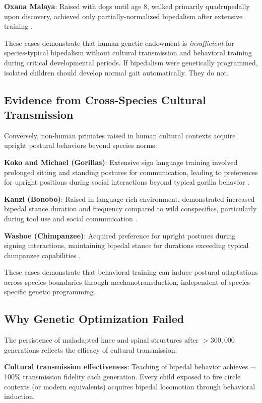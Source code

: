 \documentclass[12pt,a4paper]{article}
\begin{document}
\textbf{Oxana Malaya}: Raised with dogs until age 8, walked primarily quadrupedally upon discovery, achieved only partially-normalized bipedalism after extensive training \citep{wilson2003nurture}.

These cases demonstrate that human genetic endowment is \textit{insufficient} for species-typical bipedalism without cultural transmission and behavioral training during critical developmental periods. If bipedalism were genetically programmed, isolated children should develop normal gait automatically. They do not.

\subsection{Evidence from Cross-Species Cultural Transmission}

Conversely, non-human primates raised in human cultural contexts acquire upright postural behaviors beyond species norms:

\textbf{Koko and Michael (Gorillas)}: Extensive sign language training involved prolonged sitting and standing postures for communication, leading to preferences for upright positions during social interactions beyond typical gorilla behavior \citep{patterson1978linguistic}.

\textbf{Kanzi (Bonobo)}: Raised in language-rich environment, demonstrated increased bipedal stance duration and frequency compared to wild conspecifics, particularly during tool use and social communication \citep{savage-rumbaugh1998apes}.

\textbf{Washoe (Chimpanzee)}: Acquired preference for upright postures during signing interactions, maintaining bipedal stance for durations exceeding typical chimpanzee capabilities \citep{gardner1989teaching}.

These cases demonstrate that behavioral training can induce postural adaptations across species boundaries through mechanotransduction, independent of species-specific genetic programming.

\subsection{Why Genetic Optimization Failed}

The persistence of maladapted knee and spinal structures after $>300,000$ generations reflects the efficacy of cultural transmission:

\textbf{Cultural transmission effectiveness}: Teaching of bipedal behavior achieves $\sim$100\% transmission fidelity each generation. Every child exposed to fire circle contexts (or modern equivalents) acquires bipedal locomotion through behavioral induction.
\end{document}
